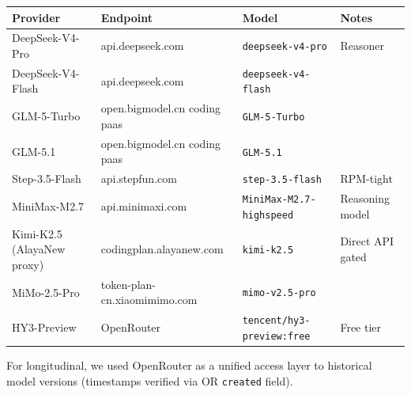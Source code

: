 \documentclass[11pt]{article}
\providecommand{\passthrough}[1]{#1}
\newcounter{none}
\begin{document}
{\def\LTcaptype{none} %
\begin{longtable}[]{@{}
  >{\raggedright\arraybackslash}p{}
  >{\raggedright\arraybackslash}p{}
  >{\raggedright\arraybackslash}p{}
  >{\raggedright\arraybackslash}p{}@{}}
\toprule\noalign{}
\begin{minipage}[b]{\linewidth}\raggedright
Provider
\end{minipage} & \begin{minipage}[b]{\linewidth}\raggedright
Endpoint
\end{minipage} & \begin{minipage}[b]{\linewidth}\raggedright
Model
\end{minipage} & \begin{minipage}[b]{\linewidth}\raggedright
Notes
\end{minipage} \\
\midrule\noalign{}
\endhead
\bottomrule\noalign{}
\endlastfoot
DeepSeek-V4-Pro & api.deepseek.com &
\passthrough{\lstinline!deepseek-v4-pro!} & Reasoner \\
DeepSeek-V4-Flash & api.deepseek.com &
\passthrough{\lstinline!deepseek-v4-flash!} & \\
GLM-5-Turbo & open.bigmodel.cn coding paas &
\passthrough{\lstinline!GLM-5-Turbo!} & \\
GLM-5.1 & open.bigmodel.cn coding paas &
\passthrough{\lstinline!GLM-5.1!} & \\
Step-3.5-Flash & api.stepfun.com &
\passthrough{\lstinline!step-3.5-flash!} & RPM-tight \\
MiniMax-M2.7 & api.minimaxi.com &
\passthrough{\lstinline!MiniMax-M2.7-highspeed!} & Reasoning model \\
Kimi-K2.5 (AlayaNew proxy) & codingplan.alayanew.com &
\passthrough{\lstinline!kimi-k2.5!} & Direct API gated \\
MiMo-2.5-Pro & token-plan-cn.xiaomimimo.com &
\passthrough{\lstinline!mimo-v2.5-pro!} & \\
HY3-Preview & OpenRouter &
\passthrough{\lstinline!tencent/hy3-preview:free!} & Free tier \\
\end{longtable}
}

For longitudinal, we used OpenRouter as a unified access layer to
historical model versions (timestamps verified via OR
\passthrough{\lstinline!created!} field).
\end{document}
